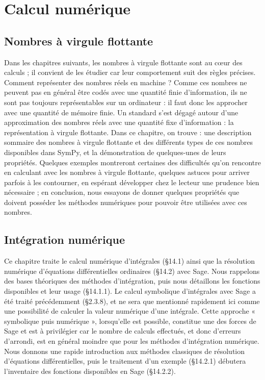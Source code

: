 \part{Calcul numérique}
\chapter{Nombres à virgule flottante}
Dans les chapitres suivants, les nombres à virgule flottante sont au cœur des
calculs ; il convient de les étudier car leur comportement suit des règles précises.
Comment représenter des nombres réels en machine ? Comme ces nombres ne
peuvent pas en général être codés avec une quantité finie d’information, ils ne
sont pas toujours représentables sur un ordinateur : il faut donc les approcher
avec une quantité de mémoire finie.
Un standard s’est dégagé autour d’une approximation des nombres réels avec
une quantité fixe d’information : la représentation à virgule flottante.
Dans ce chapitre, on trouve : une description sommaire des nombres à virgule
flottante et des différents types de ces nombres disponibles dans SymPy, et la 
démonstration de quelques-unes de leurs propriétés. Quelques exemples montreront
certaines des difficultés qu’on rencontre en calculant avec les nombres à virgule
flottante, quelques astuces pour arriver parfois à les contourner, en espérant 
développer chez le lecteur une prudence bien nécessaire ; en conclusion, nous essayons
de donner quelques propriétés que doivent posséder les méthodes numériques pour
pouvoir être utilisées avec ces nombres.

\chapter{Intégration numérique}
Ce chapitre traite le calcul numérique d’intégrales (§14.1) ainsi que la résolution
numérique d’équations différentielles ordinaires (§14.2) avec Sage. Nous rappelons
des bases théoriques des méthodes d’intégration, puis nous détaillons les fonctions
disponibles et leur usage (§14.1.1). Le calcul symbolique d’intégrales avec Sage a été traité précédemment (§2.3.8), et ne sera que mentionné rapidement ici comme une possibilité de calculer la
valeur numérique d’une intégrale. Cette approche « symbolique puis numérique »,
lorsqu’elle est possible, constitue une des forces de Sage et est à privilégier car le
nombre de calculs effectués, et donc d’erreurs d’arrondi, est en général moindre
que pour les méthodes d’intégration numérique.
Nous donnons une rapide introduction aux méthodes classiques de résolution
d’équations différentielles, puis le traitement d’un exemple (§14.2.1) débutera
l’inventaire des fonctions disponibles en Sage (§14.2.2).

